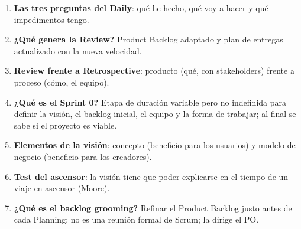 \documentclass[11pt,a4paper,oneside,openany]{report}
\begin{document}
\begin{enumerate}[leftmargin=*,itemsep=4pt]
        planificación detallada (cómo: división en tareas por el equipo).
  \item \textbf{Las tres preguntas del Daily}: qué he hecho, qué voy a hacer y qué impedimentos tengo.
  \item \textbf{¿Qué genera la Review?} Product Backlog adaptado y plan de entregas actualizado con la nueva velocidad.
  \item \textbf{Review frente a Retrospective}: producto (qué, con stakeholders) frente a proceso (cómo, el equipo).
  \item \textbf{¿Qué es el Sprint 0?} Etapa de duración variable pero no indefinida para definir la visión, el backlog
        inicial, el equipo y la forma de trabajar; al final se sabe si el proyecto es viable.
  \item \textbf{Elementos de la visión}: concepto (beneficio para los usuarios) y modelo de negocio (beneficio para los
        creadores).
  \item \textbf{Test del ascensor}: la visión tiene que poder explicarse en el tiempo de un viaje en ascensor (Moore).
  \item \textbf{¿Qué es el backlog grooming?} Refinar el Product Backlog justo antes de cada Planning; no es una reunión
        formal de Scrum; la dirige el PO.
\end{enumerate}

\clearpage
\end{document}

